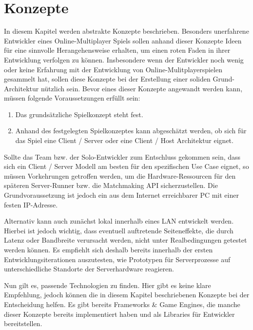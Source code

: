 \chapter{Konzepte}
\label{sec:konzepte}

In diesem Kapitel werden abstrakte Konzepte beschrieben. Besonders unerfahrene Entwickler eines Online-Multiplayer Spiels sollen anhand dieser Konzepte Ideen für eine sinnvolle Herangehensweise erhalten, um einen roten Faden in ihrer Entwicklung verfolgen zu können. Insbesondere wenn der Entwickler noch wenig oder keine Erfahrung mit der Entwicklung von Online-Mulitplayerspielen gesammelt hat, sollen diese Konzepte bei der Erstellung einer soliden Grund-Architektur nützlich sein. Bevor eines dieser Konzepte angewandt werden kann, müssen folgende Voraussetzungen erfüllt sein:

\begin{enumerate}
	\item Das grundsätzliche Spielkonzept steht fest.
	\item Anhand des festgelegten Spielkonzeptes kann abgeschätzt werden, ob sich für das Spiel eine Client / Server oder eine Client / Host Architektur eignet.
\end{enumerate}

Sollte das Team bzw. der Solo-Entwickler zum Entschluss gekommen sein, dass sich ein Client / Server Modell am besten für den spezifischen Use Case eignet, so müssen Vorkehrungen getroffen werden, um die Hardware-Ressourcen für den späteren Server-Runner bzw. die Matchmaking API sicherzustellen. Die Grundvoraussetzung ist jedoch ein aus dem Internet erreichbarer PC mit einer festen IP-Adresse. 

Alternativ kann auch zunächst lokal innerhalb eines LAN entwickelt werden. Hierbei ist jedoch wichtig, dass eventuell auftretende Seiteneffekte, die durch Latenz oder Bandbreite verursacht werden, nicht unter Realbedingungen getestet werden können. Es empfiehlt sich deshalb bereits innerhalb der ersten Entwicklungsiterationen auszutesten, wie Prototypen für Serverprozesse auf unterschiedliche Standorte der Serverhardware reagieren. 

Nun gilt es, passende Technologien zu finden. Hier gibt es keine klare Empfehlung, jedoch können die in diesem Kapitel beschriebenen Konzepte bei der Entscheidung helfen. Es gibt bereits Frameworks \& Game Engines, die manche dieser Konzepte bereits implementiert haben und als Libraries für Entwickler bereitstellen.

\cite{MFatihMAR.2021}

